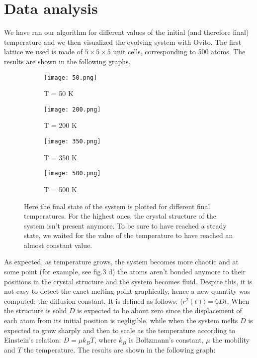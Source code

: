 \documentclass[10pt,a4paper,titlepage]{article}
\begin{document}
\section*{Data analysis}
\noindent We have ran our algorithm for different values of the initial (and therefore final) temperature and we then visualized the evolving system with Ovito. The first lattice we used is made of $5 \times 5 \times 5$ unit cells, corresponding to 500 atoms. The results are shown in the following graphs.
\begin{center}
\begin{figure}[H]
 \centering
\begin{subfigure}{.4\textwidth}
  \centering
  \texttt{[image: 50.png]}
  \caption{\footnotesize T = 50 K}
  \label{fig:sfig2}
\end{subfigure}%
\begin{subfigure}{.4\textwidth}
  \centering
  \texttt{[image: 200.png]}
  \caption{\footnotesize T = 200 K}
  \label{fig:sfig2}
\end{subfigure}
\begin{subfigure}{.4\textwidth}
  \centering
  \texttt{[image: 350.png]}
  \caption{\footnotesize T = 350 K}
  \label{fig:sfig2}
\end{subfigure}%
\begin{subfigure}{.4\textwidth}
  \centering
  \texttt{[image: 500.png]}
  \caption{\footnotesize T = 500 K}
  \label{fig:sfig2}
\end{subfigure}%
\caption{{\footnotesize Here the final state of the system is plotted for different final temperatures. For the highest ones, the crystal structure of the system isn't present anymore. To be sure to have reached a steady state, we waited for the value of the temperature to have reached an almost constant value.}}
\label{fig:fig}
\end{figure}
\end{center} 
As expected, as temperature grows, the system becomes more chaotic and at some point (for example, see fig.3 d) the atoms aren't bonded anymore to their positions in the crystal structure and the system becomes fluid. Despite this, it is not easy to detect the exact melting point graphically, hence a new quantity was computed: the diffusion constant. It is defined as follows: $\langle r^2(t) \rangle = 6Dt$. When the structure is solid $D$ is expected to be about zero since the displacement of each atom from its initial position is negligible, while when the system melts $D$ is expected to grow sharply and then to scale as the temperature according to Einstein's relation: $D=\mu k_B T$, where $k_B$ is Boltzmann's constant, $\mu$ the mobility and $T$ the temperature. The results are shown in the following graph:
\end{document}

